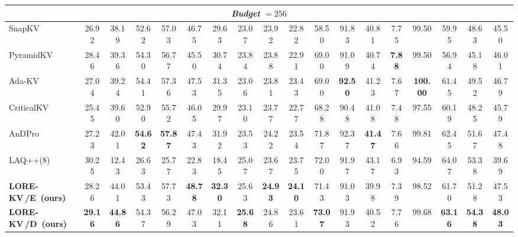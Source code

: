 \documentclass{article} %
\newcommand{\best}[1]{\textcolor{bestblue}{\textbf{#1}}}
\newcommand{\second}[1]{\textcolor{secondorange}{#1}}
\newcommand{\lorekvE}{LORE-KV\,/E}
\newcommand{\lorekvD}{LORE-KV\,/D}
\begin{document}
\begin{table}[t]
{\begin{tabular}{lccccccccccccccccc}
\midrule
\multicolumn{18}{c}{\textit{Budget} $=256$} \\
\midrule
SnapKV & 26.92 & 38.19 & 52.62 & 57.03 & 46.75 & 29.63 & 23.07 & 23.92 & 22.82 & 58.50 & 91.83 & 40.81 & 7.75 & 99.50 & 59.95 & 48.63 & 45.50 \\
PyramidKV & \second{28.46} & 39.36 & 54.30 & 56.77 & 45.50 & 30.74 & 23.84 & 23.88 & 22.91 & 69.00 & 91.09 & 40.74 & \best{7.88} & 99.50 & 56.94 & 45.18 & 46.01 \\
Ada-KV & 27.04 & 39.24 & \second{54.41} & 57.36 & \second{47.53} & 31.35 & 23.06 & 23.81 & 23.43 & 69.00 & \best{92.50} & \second{41.23} & 7.67 & \best{100.00} & 61.45 & 49.52 & 46.79 \\
CriticalKV & 25.45 & 39.60 & 52.90 & 55.72 & 46.05 & 29.97 & 23.10 & 23.77 & 22.77 & 68.28 & 90.48 & 41.08 & 7.48 & 97.55 & 60.19 & 48.25 & 45.79 \\
AnDPro & 27.23 & 42.01 & \best{54.62} & \best{57.87} & 47.43 & 31.92 & 23.53 & 24.22 & 23.54 & \second{71.87} & \second{92.37} & \best{41.47} & 7.66 & \second{99.81} & \second{62.45} & \second{51.67} & 47.48 \\
LAQ++(8) \citep{wang2025lookahead} & 30.25 & 12.43 & 26.63 & 25.77 & 22.83 & 18.45 & 25.07 & 23.67 & 23.75 & 72.00 & 91.97 & 43.17 & 6.93 & 94.59 & 64.07 & 53.38 & 39.69 \\
\textbf{\lorekvE\ (ours)} & 28.26 & \second{44.01} & 53.43 & \second{57.73} & \best{48.78} & \best{32.30} & \second{25.63} & \best{24.93} & \best{24.10} & 71.43 & 91.03 & 39.98 & 7.39 & 98.52 & 61.70 & 51.28 & \second{47.53} \\
\textbf{\lorekvD\ (ours)} & \best{29.16} & \best{44.86} & 54.37 & 56.29 & 47.03 & \second{32.11} & \best{25.68} & \second{24.86} & \second{23.61} & \best{73.07} & 91.93 & 40.52 & \second{7.76} & 99.68 & \best{63.16} & \best{54.38} & \best{48.03} \\


\end{tabular}}
\end{table}
\end{document}
